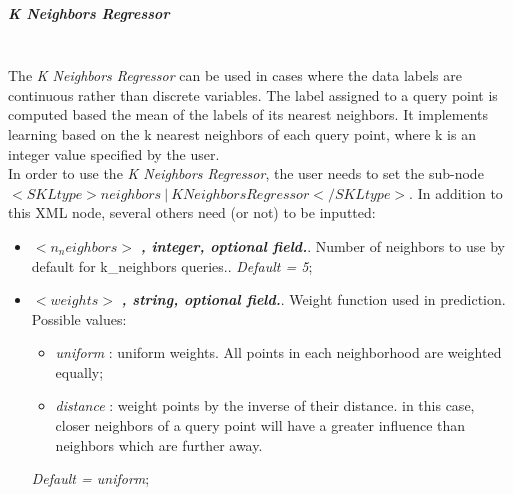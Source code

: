 \subparagraph{K Neighbors Regressor}
\mbox{}
\\The \textit{K Neighbors Regressor}  can be used in cases where the data labels are continuous rather than discrete variables. The label assigned to a query point is computed based the mean of the labels of its nearest neighbors. It implements learning based on the k nearest neighbors of each query point, where k is an integer value specified by the user.
\\In order to use the   \textit{K Neighbors Regressor}, the user needs to set the sub-node $<SKLtype>neighbors~\vert~KNeighborsRegressor</SKLtype>$. In addition to this XML node, several others need (or not) to be inputted:
\begin{itemize}
\item $<n_neighbors>$ \textbf{\textit{, integer, optional field.}}.  Number of neighbors to use by default for k\_neighbors queries.. \textit{Default = 5};
\item $<weights>$ \textbf{\textit{, string, optional field.}}. Weight function used in prediction. Possible values:
\begin{itemize}
\item \textit{uniform} : uniform weights. All points in each neighborhood are weighted equally;
\item \textit{distance} : weight points by the inverse of their distance. in this case, closer neighbors of a query point will have a greater influence than neighbors which are further away.
\end{itemize}
\textit{Default = uniform};


\end{itemize}
